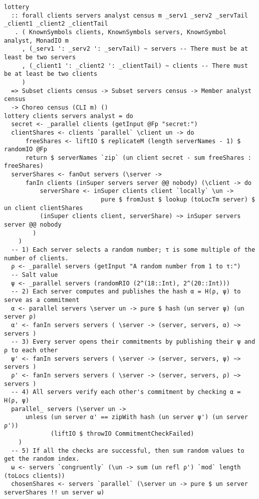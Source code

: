 \documentclass[sigplan,screen]{acmart}
\begin{document}
\begin{figure*}
\begin{mdframed}
\begin{verbatim}
lottery
  :: forall clients servers analyst census m _serv1 _serv2 _servTail _client1 _client2 _clientTail
   . ( KnownSymbols clients, KnownSymbols servers, KnownSymbol analyst, MonadIO m
     , (_serv1 ': _serv2 ': _servTail) ~ servers -- There must be at least be two servers
     , (_client1 ': _client2 ': _clientTail) ~ clients -- There must be at least be two clients
     )
  => Subset clients census -> Subset servers census -> Member analyst census
  -> Choreo census (CLI m) ()
lottery clients servers analyst = do
  secret <- _parallel clients (getInput @Fp "secret:")
  clientShares <- clients `parallel` \client un -> do
      freeShares <- liftIO $ replicateM (length serverNames - 1) $ randomIO @Fp
      return $ serverNames `zip` (un client secret - sum freeShares : freeShares)
  serverShares <- fanOut servers (\server ->
      fanIn clients (inSuper servers server @@ nobody) (\client -> do
          serverShare <- inSuper clients client `locally` \un ->
                           pure $ fromJust $ lookup (toLocTm server) $ un client clientShares
          (inSuper clients client, serverShare) ~> inSuper servers server @@ nobody
        )
    )
  -- 1) Each server selects a random number; τ is some multiple of the number of clients.
  ρ <- _parallel servers (getInput "A random number from 1 to τ:")
  -- Salt value
  ψ <- _parallel servers (randomRIO (2^(18::Int), 2^(20::Int)))
  -- 2) Each server computes and publishes the hash α = H(ρ, ψ) to serve as a commitment
  α <- parallel servers \server un -> pure $ hash (un server ψ) (un server ρ)
  α' <- fanIn servers servers ( \server -> (server, servers, α) ~> servers )
  -- 3) Every server opens their commitments by publishing their ψ and ρ to each other
  ψ' <- fanIn servers servers ( \server -> (server, servers, ψ) ~> servers )
  ρ' <- fanIn servers servers ( \server -> (server, servers, ρ) ~> servers )
  -- 4) All servers verify each other's commitment by checking α = H(ρ, ψ)
  parallel_ servers (\server un ->
      unless (un server α' == zipWith hash (un server ψ') (un server ρ'))
             (liftIO $ throwIO CommitmentCheckFailed)
    )
  -- 5) If all the checks are successful, then sum random values to get the random index.
  ω <- servers `congruently` (\un -> sum (un refl ρ') `mod` length (toLocs clients))
  chosenShares <- servers `parallel` (\server un -> pure $ un server serverShares !! un server ω)

\end{verbatim}
\end{mdframed}
\end{figure*}
\end{document}
